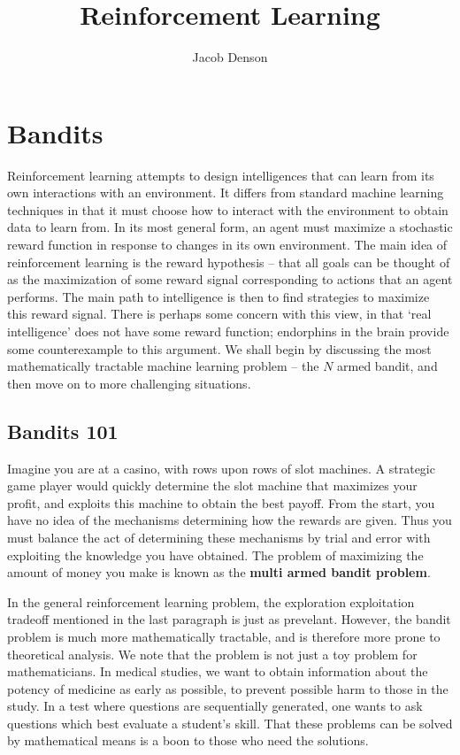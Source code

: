 

\title{Reinforcement Learning}
\author{Jacob Denson}



\maketitle
\tableofcontents
{}

\newpage

\part{Bandits}

Reinforcement learning attempts to design intelligences that can learn from its own interactions with an environment. It differs from standard machine learning techniques in that it must choose how to interact with the environment to obtain data to learn from. In its most general form, an agent must maximize a stochastic reward function in response to changes in its own environment. The main idea of reinforcement learning is the reward hypothesis -- that all goals can be thought of as the maximization of some reward signal corresponding to actions that an agent performs. The main path to intelligence is then to find strategies to maximize this reward signal. There is perhaps some concern with this view, in that `real intelligence' does not have some reward function; endorphins in the brain provide some counterexample to this argument. We shall begin by discussing the most mathematically tractable machine learning problem -- the $N$ armed bandit, and then move on to more challenging situations.

\chapter{Bandits 101}

Imagine you are at a casino, with rows upon rows of slot machines. A strategic game player would quickly determine the slot machine that maximizes your profit, and exploits this machine to obtain the best payoff. From the start, you have no idea of the mechanisms determining how the rewards are given. Thus you must balance the act of determining these mechanisms by trial and error with exploiting the knowledge you have obtained. The problem of maximizing the amount of money you make is known as the {\bf multi armed bandit problem}.

In the general reinforcement learning problem, the exploration exploitation tradeoff mentioned in the last paragraph is just as prevelant. However, the bandit problem is much more mathematically tractable, and is therefore more prone to theoretical analysis. We note that the problem is not just a toy problem for mathematicians. In medical studies, we want to obtain information about the potency of medicine as early as possible, to prevent possible harm to those in the study. In a test where questions are sequentially generated, one wants to ask questions which best evaluate a student's skill. That these problems can be solved by mathematical means is a boon to those who need the solutions.

